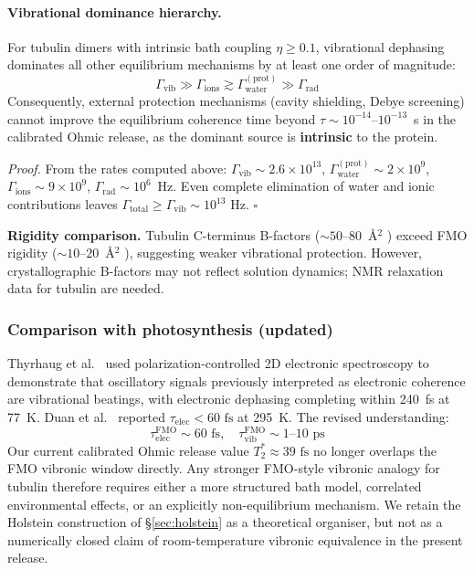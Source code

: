 \documentclass[twocolumn,10pt]{article}
\newcommand{\ps}{\text{~ps}}
\newcommand{\fs}{\text{~fs}}
\newcommand{\Hz}{\text{~Hz}}
\begin{document}
\paragraph{Vibrational dominance hierarchy.}
\label{prop:vib_dominance}
For tubulin dimers with intrinsic bath coupling $\eta \geq 0.1$,
vibrational dephasing dominates all other equilibrium mechanisms by at
least one order of magnitude:
\begin{equation}
\Gamma_{\text{vib}} \gg \Gamma_{\text{ions}} \gtrsim
\Gamma_{\text{water}}^{(\text{prot})} \gg \Gamma_{\text{rad}}
\end{equation}
Consequently, external protection mechanisms (cavity shielding, Debye
screening) cannot improve the equilibrium coherence time beyond
$\tau \sim 10^{-14}\text{--}10^{-13}$~s in the calibrated Ohmic release,
as the dominant source is \textbf{intrinsic} to the protein.

\textit{Proof.} From the rates computed above:
$\Gamma_{\text{vib}} \sim 2.6\times 10^{13}$,
$\Gamma_{\text{water}}^{(\text{prot})} \sim 2\times 10^{9}$,
$\Gamma_{\text{ions}} \sim 9\times 10^{9}$,
$\Gamma_{\text{rad}} \sim 10^6$~Hz. Even complete elimination of water and
ionic contributions leaves
$\Gamma_{\text{total}} \geq \Gamma_{\text{vib}} \sim 10^{13}\Hz$.
\hfill $\square$

\textbf{Rigidity comparison.} Tubulin C-terminus B-factors
($\sim 50\text{--}80$~\AA$^2$ \cite{Nogales1998}) exceed FMO rigidity
($\sim 10\text{--}20$~\AA$^2$ \cite{Adolphs2006}), suggesting weaker
vibrational protection. However, crystallographic B-factors may not reflect
solution dynamics; NMR relaxation data for tubulin are needed.

\subsubsection{Comparison with photosynthesis (updated)}
Thyrhaug et al.\ \cite{Thyrhaug2018,Thyrhaug2018b} used polarization-controlled 2D
electronic spectroscopy to demonstrate that oscillatory signals previously
interpreted as electronic coherence are vibrational beatings, with
electronic dephasing completing within 240~fs at 77~K. Duan et al.\
\cite{Duan2017} reported $\tau_{\text{elec}} < 60\fs$ at 295~K. The revised
understanding:
\begin{equation}
\tau_{\text{elec}}^{\text{FMO}} \sim 60\fs, \quad
\tau_{\text{vib}}^{\text{FMO}} \sim 1\text{--}10\ps
\end{equation}
Our current calibrated Ohmic release value $T_2^* \approx 39\fs$ no longer
overlaps the FMO vibronic window directly. Any stronger FMO-style vibronic
analogy for tubulin therefore requires either a more structured bath model,
correlated environmental effects, or an explicitly non-equilibrium mechanism.
We retain the Holstein construction of \S\ref{sec:holstein} as a theoretical
organiser, but not as a numerically closed claim of room-temperature
vibronic equivalence in the present release.
\end{document}
